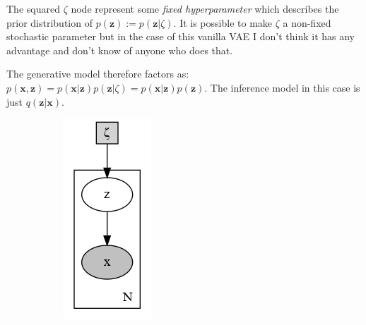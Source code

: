 \documentclass[11pt, a4paper]{report}
\theoremstyle{plain}
\theoremstyle{definition}
\theoremstyle{remark}
\newcommand{\x}{\mathbf{x}}
\newcommand{\z}{\mathbf{z}}
\begin{document}
The squared $\zeta$ node represent some \emph{fixed hyperparameter} which describes the
prior distribution of $p(\z) := p(\z | \zeta)$.
It is possible to make $\zeta$ a non-fixed stochastic parameter but in the case of this
vanilla VAE I don't think it has any advantage and don't know of anyone who 
does that. 

The generative model therefore factors as: $p(\x,\z) = p(\x|\z)p(\z|\zeta) =
p(\x|\z)p(\z)$.
The inference model in this case is just $q(\z | \x)$.

\begin{figure}[h]
\centering
\begin{subfigure}[b]{0.2\textwidth}
\includegraphics[width=\textwidth]{plots/vae_p.gv.png}

\end{subfigure}
\end{figure}
\end{document}
